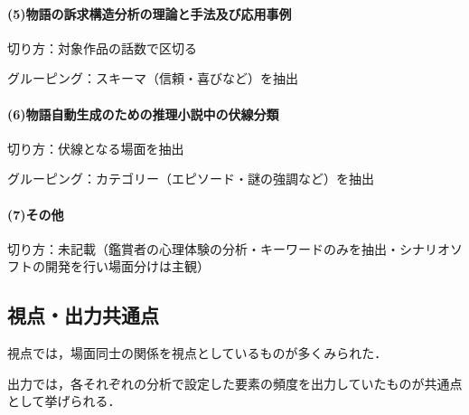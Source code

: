 \paragraph*{(5)物語の訴求構造分析の理論と手法及び応用事例\cite{sokyu}}

切り方：対象作品の話数で区切る

グルーピング：スキーマ（信頼・喜びなど）を抽出

\paragraph*{(6)物語自動生成のための推理小説中の伏線分類\cite{suiri}}

切り方：伏線となる場面を抽出

グルーピング：カテゴリー（エピソード・謎の強調など）を抽出

\paragraph*{(7)その他}

切り方：未記載（鑑賞者の心理体験の分析\cite{anime}・キーワードのみを抽出\cite{onrain}・シナリオソフトの開発\cite{rumiko16}を行い場面分けは主観）

\subsection{視点・出力共通点}
視点では，場面同士の関係を視点としているものが多くみられた．

出力では，各それぞれの分析で設定した要素の頻度を出力していたものが共通点として挙げられる．